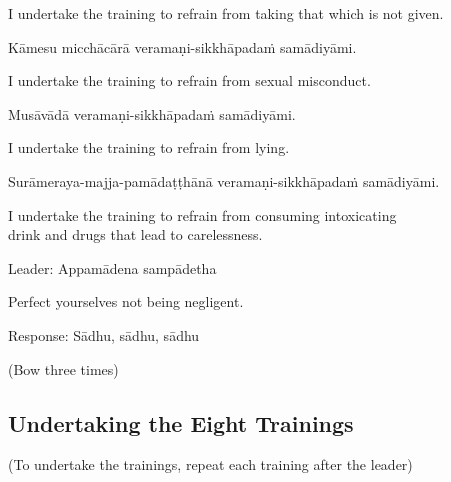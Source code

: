 \begin{english}
  I undertake the training to refrain from taking that which is not given.\\
\end{english}

Kāmesu micchācārā veramaṇi-sikkhāpadaṁ samādiyāmi.\\

\begin{english}
  I undertake the training to refrain from sexual misconduct.\\
\end{english}

Musāvādā veramaṇi-sikkhāpadaṁ samādiyāmi.\\

\begin{english}
  I undertake the training to refrain from lying.\\
\end{english}

Surāmeraya-majja-pamādaṭṭhānā veramaṇi-sikkhāpadaṁ samādiyāmi.\\

\begin{english}
  I undertake the training to refrain from consuming intoxicating\\
  drink and drugs that lead to carelessness.\\
  \end{english}

Leader: Appamādena sampādetha\\

\begin{english}
  Perfect yourselves not being negligent.\\
\end{english}

Response: Sādhu, sādhu, sādhu\\

\begin{center}
  (Bow three times)\\
\end{center}

\subsection{Undertaking the Eight Trainings}

\begin{center}
  (To undertake the trainings, repeat each training after the leader)\\
\end{center}

